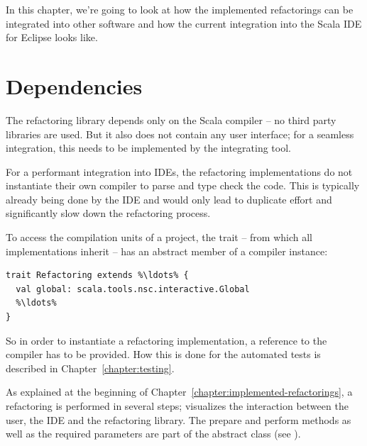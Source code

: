 \documentclass[10pt,a4paper,oneside]{scrreprt}
\begin{document}
In this chapter, we're going to look at how the implemented refactorings can be integrated into other software and how the current integration into the Scala IDE for Eclipse looks like.

\section{Dependencies}

The refactoring library depends only on the Scala compiler -- no third party libraries are used. But it also does not contain any user interface; for a seamless integration, this needs to be implemented by the integrating tool.

For a performant integration into IDEs, the refactoring implementations do not instantiate their own compiler to parse and type check the code. This is typically already being done by the IDE and would only lead to duplicate effort and significantly slow down the refactoring process.

To access the compilation units of a project, the  trait -- from which all implementations inherit -- has an abstract member of a compiler instance:

\begin{lstlisting}
trait Refactoring extends %\ldots% {
  val global: scala.tools.nsc.interactive.Global
  %\ldots% 
}
\end{lstlisting}

So in order to instantiate a refactoring implementation, a reference to the compiler has to be provided. How this is done for the automated tests is described in Chapter~\vref{chapter:testing}.

As explained at the beginning of Chapter~\vref{chapter:implemented-refactorings}, a refactoring is performed in several steps;  visualizes the interaction between the user, the IDE and the refactoring library. The prepare and perform methods as well as the required parameters are part of the  abstract class (see ).
\end{document}
